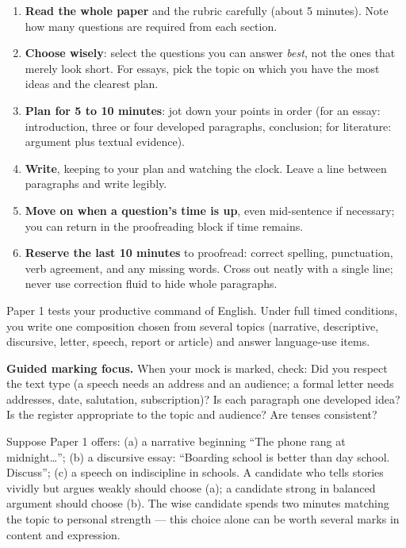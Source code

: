 \documentclass[11pt]{article}
\newcounter{popsec}
\newcounter{popsub}
\newcommand{\courssub}[1]{%
  \stepcounter{popsub}%
  \par\vspace{9pt}\noindent{\popxbold\fontsize{11.5}{13}\selectfont\color{popink}{\color{poporange}\thepopsec.\thepopsub}\hspace{6pt}#1}\par\nopagebreak\vspace{4pt}
}
\begin{document}
\begin{methode}
\begin{enumerate}
\item \textbf{Read the whole paper} and the rubric carefully (about 5 minutes). Note how many questions are required from each section.
\item \textbf{Choose wisely}: select the questions you can answer \emph{best}, not the ones that merely look short. For essays, pick the topic on which you have the most ideas and the clearest plan.
\item \textbf{Plan for 5 to 10 minutes}: jot down your points in order (for an essay: introduction, three or four developed paragraphs, conclusion; for literature: argument plus textual evidence).
\item \textbf{Write}, keeping to your plan and watching the clock. Leave a line between paragraphs and write legibly.
\item \textbf{Move on when a question's time is up}, even mid-sentence if necessary; you can return in the proofreading block if time remains.
\item \textbf{Reserve the last 10 minutes} to proofread: correct spelling, punctuation, verb agreement, and any missing words. Cross out neatly with a single line; never use correction fluid to hide whole paragraphs.
\end{enumerate}
\end{methode}

\courssub{Paper 1 Mock: Essay and Language Use}

Paper 1 tests your productive command of English. Under full timed conditions, you write one composition chosen from several topics (narrative, descriptive, discursive, letter, speech, report or article) and answer language-use items.

\textbf{Guided marking focus.} When your mock is marked, check: Did you respect the text type (a speech needs an address and an audience; a formal letter needs addresses, date, salutation, subscription)? Is each paragraph one developed idea? Is the register appropriate to the topic and audience? Are tenses consistent?

\begin{exemplebox}
Suppose Paper 1 offers: (a) a narrative beginning ``The phone rang at midnight\ldots''; (b) a discursive essay: ``Boarding school is better than day school. Discuss''; (c) a speech on indiscipline in schools. A candidate who tells stories vividly but argues weakly should choose (a); a candidate strong in balanced argument should choose (b). The wise candidate spends two minutes matching the topic to personal strength --- this choice alone can be worth several marks in content and expression.
\end{exemplebox}
\end{document}

